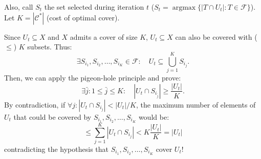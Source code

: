 Also, call $S_t$ the set selected during iteration $t$
($S_t=\operatorname{argmax}\{|T\cap U_t|:T\in\mathcal F\}$).
Let $K=|\mathcal C^*|$ (cost of optimal cover).

Since $U_t\subseteq X$ and $X$ admits a cover of size $K$, $U_t\subseteq X$ can also be covered with ($\leq$) $K$ subsets. Thus:
\[\exists S_{i_1},S_{i_2},\ldots,S_{i_K}\in\mathcal F:
\quad U_t\subseteq\bigcup_{j=1}^K S_{i_j}.\]
Then, we can apply the pigeon-hole principle and prove:
\[\exists\bar j:1\leq\bar j\leq K:\quad
|U_t\cap S_{i_{\bar j}}|\geq\frac{|U_t|}{K}.\]
By contradiction, if $\forall j:|U_t\cap S_{i_j}|<|U_t|/K$, the maximum number of elements of $U_t$ that could be covered by $S_{i_1},S_{i_2},\ldots,S_{i_K}$ would be:
\[\leq\sum_{j=1}^K|U_t\cap S_{i_j}|<K\frac{|U_t|}{K}=|U_t|\]
contradicting the hypothesis that $S_{i_1},S_{i_2},\ldots,S_{i_K}$ cover $U_t$!
